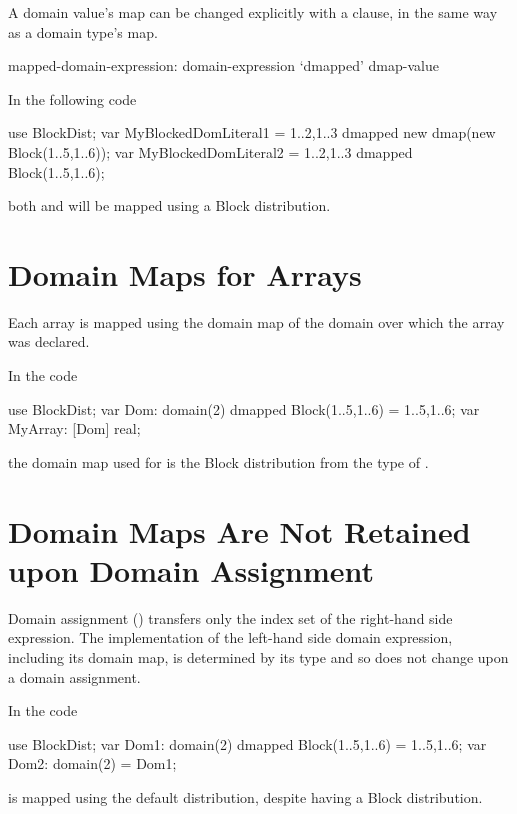 A domain value's map can be changed explicitly with a  clause,
in the same way as a domain type's map.

\begin{syntax}
mapped-domain-expression:
  domain-expression `dmapped' dmap-value
\end{syntax}

\begin{example}
In the following code
\begin{chapel}
use BlockDist;
var MyBlockedDomLiteral1 = {1..2,1..3} dmapped new dmap(new Block({1..5,1..6}));
var MyBlockedDomLiteral2 = {1..2,1..3} dmapped Block({1..5,1..6});
\end{chapel}
both  and 
will be mapped using a Block distribution.
\end{example}


\section{Domain Maps for Arrays}
\label{Domain_Maps_For_Arrays}

Each array is mapped using the domain map of the domain
over which the array was declared.

\begin{example}
In the code
\begin{chapel}
use BlockDist;
var Dom: domain(2) dmapped Block({1..5,1..6}) = {1..5,1..6};
var MyArray: [Dom] real;
\end{chapel}
the domain map used for  is the Block
distribution from the type of .
\end{example}

\section{Domain Maps Are Not Retained upon Domain Assignment}
\label{Domain_Maps_Not_Assigned}

Domain assignment () transfers only the index
set of the right-hand side expression. The implementation of the
left-hand side domain expression, including its domain map, is
determined by its type and so does not change upon a domain assignment.

\begin{example}
In the code
\begin{chapel}
use BlockDist;
var Dom1: domain(2) dmapped Block({1..5,1..6}) = {1..5,1..6};
var Dom2: domain(2) = Dom1;
\end{chapel}
 is mapped using the default distribution, despite
 having a Block distribution.
\end{example}

